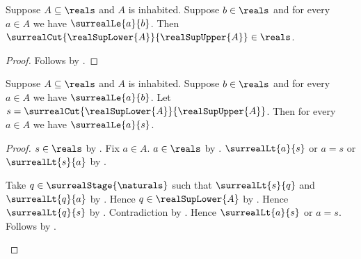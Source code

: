 \begin{theorem}\label{surreal_real_sup_cut_is_real}
    Suppose $A\subseteq\reals$ and $A$ is inhabited.
    Suppose $b\in\reals$ and for every $a\in A$ we have
        $\surrealLe{a}{b}$.
    Then
        $\surrealCut{\realSupLower{A}}{\realSupUpper{A}}
            \in\reals$.
\end{theorem}
\begin{proof}
    Follows by
        .
\end{proof}

\begin{theorem}\label{surreal_real_sup_cut_upper_bound}
    Suppose $A\subseteq\reals$ and $A$ is inhabited.
    Suppose $b\in\reals$ and for every $a\in A$ we have
        $\surrealLe{a}{b}$.
    Let $s=\surrealCut{\realSupLower{A}}{\realSupUpper{A}}$.
    Then for every $a\in A$ we have $\surrealLe{a}{s}$.
\end{theorem}
\begin{proof}
    $s\in\reals$ by .
    Fix $a\in A$.
    $a\in\reals$ by .
    $\surrealLt{a}{s}$ or $a=s$ or $\surrealLt{s}{a}$
        by .
    \begin{byCase}
            Take $q\in\surrealStage{\naturals}$ such that
                $\surrealLt{s}{q}$ and $\surrealLt{q}{a}$
                by .
            Hence $q\in\realSupLower{A}$
                by .
            Hence $\surrealLt{q}{s}$
                by
                .
            Contradiction by
                .
            Hence $\surrealLt{a}{s}$ or $a=s$.
            Follows by .
    \end{byCase}
\end{proof}

